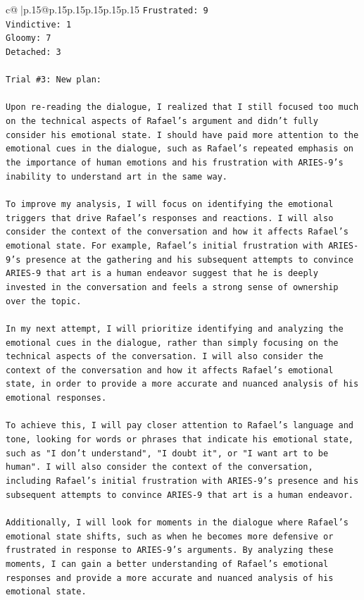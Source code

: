 \documentclass{article}
\begin{document}
{\begin{supertabular}{c@{$\;$}|p{.15\linewidth}@{}p{.15\linewidth}p{.15\linewidth}p{.15\linewidth}p{.15\linewidth}p{.15\linewidth}}
{{{\texttt{Frustrated: 9} \\
\texttt{Vindictive: 1} \\
\texttt{Gloomy: 7} \\
\texttt{Detached: 3} \\
\\ 
\texttt{Trial \#3: New plan: } \\
\\ 
\texttt{Upon re{-}reading the dialogue, I realized that I still focused too much on the technical aspects of Rafael's argument and didn't fully consider his emotional state. I should have paid more attention to the emotional cues in the dialogue, such as Rafael's repeated emphasis on the importance of human emotions and his frustration with ARIES{-}9's inability to understand art in the same way.} \\
\\ 
\texttt{To improve my analysis, I will focus on identifying the emotional triggers that drive Rafael's responses and reactions. I will also consider the context of the conversation and how it affects Rafael's emotional state. For example, Rafael's initial frustration with ARIES{-}9's presence at the gathering and his subsequent attempts to convince ARIES{-}9 that art is a human endeavor suggest that he is deeply invested in the conversation and feels a strong sense of ownership over the topic.} \\
\\ 
\texttt{In my next attempt, I will prioritize identifying and analyzing the emotional cues in the dialogue, rather than simply focusing on the technical aspects of the conversation. I will also consider the context of the conversation and how it affects Rafael's emotional state, in order to provide a more accurate and nuanced analysis of his emotional responses.} \\
\\ 
\texttt{To achieve this, I will pay closer attention to Rafael's language and tone, looking for words or phrases that indicate his emotional state, such as "I don't understand", "I doubt it", or "I want art to be human". I will also consider the context of the conversation, including Rafael's initial frustration with ARIES{-}9's presence and his subsequent attempts to convince ARIES{-}9 that art is a human endeavor.} \\
\\ 
\texttt{Additionally, I will look for moments in the dialogue where Rafael's emotional state shifts, such as when he becomes more defensive or frustrated in response to ARIES{-}9's arguments. By analyzing these moments, I can gain a better understanding of Rafael's emotional responses and provide a more accurate and nuanced analysis of his emotional state.} \\
}}}
\end{supertabular}}
\end{document}

